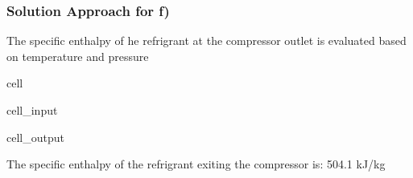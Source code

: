 \documentclass[letterpaper,10pt,english]{jupyterBook}
\begin{document}
\subsubsection{Solution Approach for f)}
\label{\detokenize{notebooks/Chapter5/CH5-Q8:solution-approach-for-f}}
\sphinxAtStartPar
The specific enthalpy of he refrigrant at the compressor outlet is evaluated based on temperature and pressure

\begin{sphinxuseclass}{cell}\begin{sphinxVerbatimInput}

\begin{sphinxuseclass}{cell_input}
\begin{sphinxVerbatim}[commandchars=\\\{\}]
     
         
  
\end{sphinxVerbatim}

\end{sphinxuseclass}\end{sphinxVerbatimInput}
\begin{sphinxVerbatimOutput}

\begin{sphinxuseclass}{cell_output}
\begin{sphinxVerbatim}[commandchars=\\\{\}]
The specific enthalpy of the refrigrant exiting the compressor is: 504.1 kJ/kg
\end{sphinxVerbatim}

\end{sphinxuseclass}\end{sphinxVerbatimOutput}

\end{sphinxuseclass}
\end{document}
